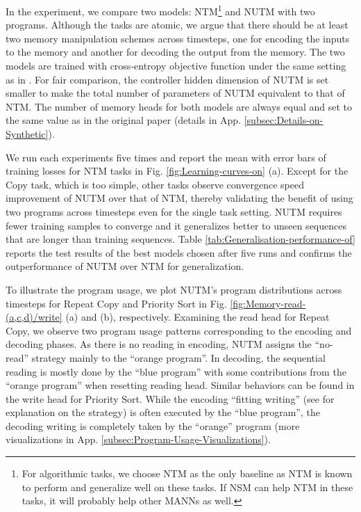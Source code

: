 \documentclass[english]{article}
\begin{document}
In the experiment, we compare two models: NTM\footnote{For algorithmic tasks, we choose NTM as the only baseline as NTM is
known to perform and generalize well on these tasks. If NSM can help
NTM in these tasks, it will probably help other MANNs as well.} and NUTM with two programs. Although the tasks are atomic, we argue
that there should be at least two memory manipulation schemes across
timesteps, one for encoding the inputs to the memory and another for
decoding the output from the memory. The two models are trained with
cross-entropy objective function under the same setting as in \citet{graves2014neural}
. For fair comparison, the controller hidden dimension of NUTM is
set smaller to make the total number of parameters of NUTM equivalent
to that of NTM. The number of memory heads for both models are always
equal and set to the same value as in the original paper (details
in App. \ref{subsec:Details-on-Synthetic}).

We run each experiments five times and report the mean with error
bars of training losses for NTM tasks in Fig. \ref{fig:Learning-curves-on}
(a). Except for the Copy task, which is too simple, other tasks observe
convergence speed improvement of NUTM over that of NTM, thereby validating
the benefit of using two programs across timesteps even for the single
task setting. NUTM requires fewer training samples to converge and
it generalizes better to unseen sequences that are longer than training
sequences. Table \ref{tab:Generalisation-performance-of} reports
the test results of the best models chosen after five runs and confirms
the outperformance of NUTM over NTM for generalization. 

To illustrate the program usage, we plot NUTM's program distributions
across timesteps for Repeat Copy and Priority Sort in Fig. \ref{fig:Memory-read-(a,c,d)/write}
(a) and (b), respectively. Examining the read head for Repeat Copy,
we observe two program usage patterns corresponding to the encoding
and decoding phases. As there is no reading in encoding, NUTM assigns
the ``no-read'' strategy mainly to the ``orange program''. In
decoding, the sequential reading is mostly done by the ``blue program''
with some contributions from the ``orange program'' when resetting
reading head. Similar behaviors can be found in the write head for
Priority Sort. While the encoding ``fitting writing'' (see \citet{graves2014neural}
for explanation on the strategy) is often executed by the ``blue
program'', the decoding writing is completely taken by the ``orange''
program (more visualizations in App. \ref{subsec:Program-Usage-Visualizations}). 
\end{document}
